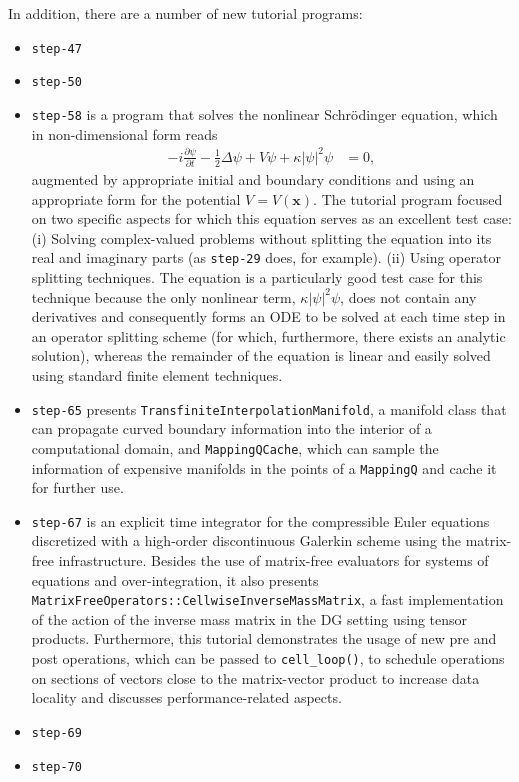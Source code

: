 \documentclass{ansarticle-preprint}
\begin{document}
In addition, there are a number of new tutorial programs:
\begin{itemize}
\item \texttt{step-47}
\item \texttt{step-50}
  
\item \texttt{step-58} is a program that solves the nonlinear
  Schr{\"o}dinger equation, which in non-dimensional form reads
  \begin{align*}
  - i \frac{\partial \psi}{\partial t}
  - \frac 12 \Delta \psi
  + V \psi
  + \kappa |\psi|^2 \psi
  &= 0,
  \end{align*}
  augmented by appropriate initial and boundary conditions and using
  an appropriate form for the potential $V=V(\mathbf x)$. The
  tutorial program focused on two specific aspects for which this
  equation serves as an excellent test case: (i) Solving
  complex-valued problems without splitting the equation into its
  real and imaginary parts (as \texttt{step-29} does, for
  example). (ii) Using operator splitting techniques. The equation is
  a particularly good test case for this technique because the only
  nonlinear term, $\kappa |\psi|^2 \psi$, does not contain any
  derivatives and consequently forms an ODE to be solved at each time
  step in an operator splitting scheme (for which, furthermore, there
  exists an analytic solution), whereas the remainder of the
  equation is linear and easily solved using standard finite element
  techniques.

\item \texttt{step-65} presents \texttt{TransfiniteInterpolationManifold}, a
manifold class that can propagate curved boundary information into the
interior of a computational domain, and \texttt{MappingQCache}, which can sample 
the information of expensive manifolds in the points of a \texttt{MappingQ} and 
cache it for further use.

\item \texttt{step-67} is an explicit time integrator for the
compressible Euler equations discretized with a high-order discontinuous
Galerkin scheme using the matrix-free infrastructure. Besides the use of
matrix-free evaluators for systems of equations and over-integration, it also
presents \texttt{MatrixFreeOperators::CellwiseInverseMassMatrix}, a fast implementation
of the action of the inverse mass matrix in the DG setting using tensor
products. Furthermore, this tutorial demonstrates the usage of new 
pre and post operations, which can be passed to \texttt{cell\_loop()}, to schedule operations on sections of vectors close 
to the matrix-vector product to increase data locality 
and discusses performance-related aspects.

\item \texttt{step-69}
  
\item \texttt{step-70}
\end{itemize}
\end{document}
